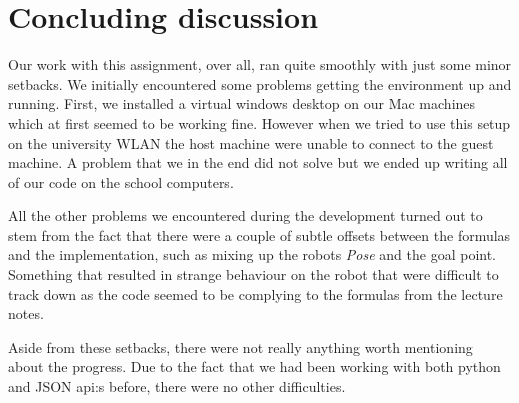 \documentclass[12pt]{article}
\begin{document}
\section{Concluding discussion}

Our work with this assignment, over all, ran quite smoothly with just some minor
setbacks. We initially encountered some problems getting the environment up and
running. First, we installed a virtual windows desktop on our Mac machines which
at first seemed to be working fine. However when we tried to use this setup on
the university WLAN the host machine were unable to connect to the guest
machine. A problem that we in the end did not solve but we ended up writing all
of our code on the school computers.

All the other problems we encountered during the development turned out
to stem from the fact that there were a couple of subtle offsets between
the formulas and the implementation, such as mixing up the robots
\textit{Pose} and the goal point. Something that resulted in strange
behaviour on the robot that were difficult to track down as the code
seemed to be complying to the formulas from the lecture notes.

Aside from these setbacks, there were not really anything worth mentioning
about the progress. Due to the fact that we had been working with both python
and JSON api:s before, there were no other difficulties.




\end{document}
